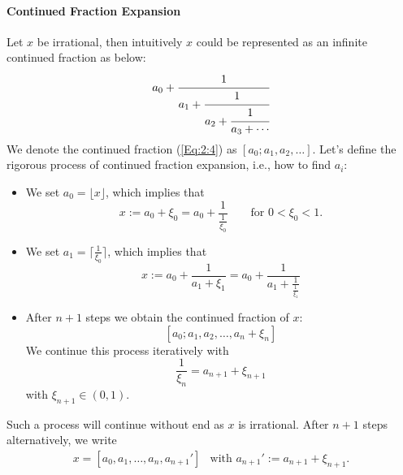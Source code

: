 \paragraph{Continued Fraction Expansion}
Let $x$ be irrational, then intuitively $x$ could be represented as an infinite continued fraction as below:
\begin{equation}\label{Eq:2:4}
a_0+\cfrac{1}{a_1+\cfrac{1}{a_2+\cfrac{1}{a_3+\cdots}}}
\end{equation}
We denote the continued fraction (\ref{Eq:2:4}) as $[a_0;a_1,a_2,\dots]$. Let's define the rigorous process of continued fraction expansion, i.e., how to find $a_i$:
\begin{itemize}
\item
We set $a_0=\lfloor{x}\rfloor$, which implies that
\[
x:=a_0+\xi_0=a_0+\frac{1}{\frac{1}{\xi_0}}\qquad
\mbox{for $0<\xi_0<1$.}
\]
\item
We set $a_1=\lceil{\frac{1}{\xi_0}}\rceil$, which implies that
\[
x:=a_0+\frac{1}{a_1+\xi_1}=a_0+\frac{1}{a_1+\frac{1}{\frac{1}{\xi_1}}}
\]
\item
After $n+1$ steps we obtain the continued fraction of $x$:
\[
[a_0;a_1,a_2,\dots,a_n+\xi_n]
\]
We continue this process iteratively with
\[
\frac{1}{\xi_n} = a_{n+1} +\xi_{n+1}
\]
with $\xi_{n+1}\in(0,1)$.
\end{itemize}
Such a process will continue without end as $x$ is irrational. After $n+1$ steps alternatively, we write
\[
\begin{array}{ll}
x=[a_0,a_1,\dots,a_n,a_{n+1}']
&
\mbox{with }a_{n+1}':=a_{n+1}+\xi_{n+1}.
\end{array}
\]


